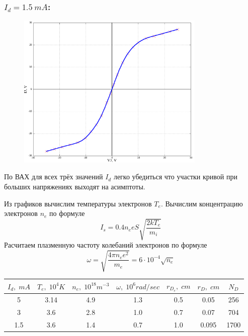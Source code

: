 \documentclass{article}
\begin{document}
\subsubsection*{\(I_d = 1.5\: mA\):}
\begin{figure}[H]
    \centering
    \includegraphics[width=0.8\textwidth]{V-A-1.5.png}
\end{figure}

По ВАХ для всех трёх значений \(I_d\) легко убедиться что участки кривой при больших напряжениях
выходят на асимптоты.

Из графиков вычислим температуры электронов \(T_e\).
Вычислим концентрацию электронов \(n_e\) по формуле
\[ I_s = 0.4n_eeS\sqrt{\frac{2kT_e}{m_i}} \]
Расчитаем плазменную частоту колебаний электронов по формуле
\[ \omega = \sqrt{\frac{4\pi n_e e^2}{m_e}} = 6\cdot 10^{-4} \sqrt{n_e}  \]



\begin{table}[H]
    \centering
    \begin{tabular}{|c|c|c|c|c|c|c|}
    \hline
    \(I_d,\; mA\)&\(T_e,\; 10^{4}K\) & \(n_e,\; 10^{18}m^{-3}\) & \(\omega,\; 10^{6}rad/sec\) & \(r_{D_e},\; cm\) & \(r_D,\; cm\) & \(N_D\) \\\hline
    5   &  3.14 & 4.9  & 1.3 &  0.5    &   0.05     &  256  \\\hline
    3   &  3.6  & 2.8  & 1.0 &  0.7    &   0.07     &  704  \\\hline
    1.5 &  3.6  & 1.4  & 0.7 &  1.0    &   0.095    &  1700 \\\hline
    \end{tabular}
\end{table}
\end{document}
